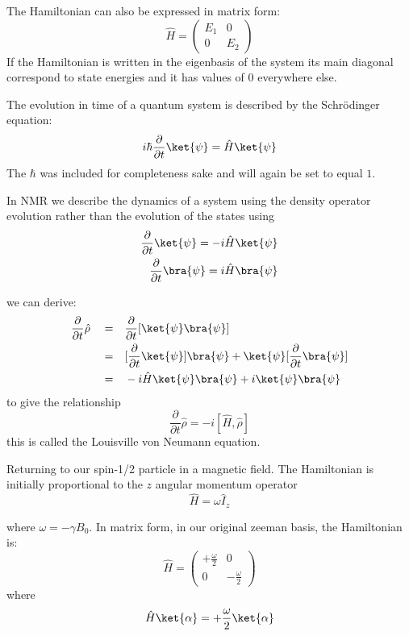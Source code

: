 The Hamiltonian can also be expressed in matrix form:
\begin{equation}
  \hat{H} = \begin{pmatrix}
    E_1 & 0\\
    0 & E_2
\end{pmatrix}
\end{equation}
If the Hamiltonian is written in the eigenbasis of the system its main diagonal correspond to state energies and it has values of $0$ everywhere else.

The evolution in time of a quantum system is described by the Schr\"odinger equation:
\begin{equation}
  i\hbar\frac{\partial}{\partial{t}}\ket{\psi} = \hat{H}\ket{\psi}
\end{equation}
The $\hbar$ was included for completeness sake and will again be set to equal $1$.

In NMR we describe the dynamics of a system using the density operator evolution rather than the evolution of the states using
\begin{align}
  \frac{\partial}{\partial{t}}\ket{\psi} = -i\hat{H}\ket{\psi}\\
  \frac{\partial}{\partial{t}}\bra{\psi} = i\hat{H}\bra{\psi}
\end{align}

we can derive\citep{Neumann2018}:
\begin{align}
  \frac{\partial}{\partial{t}}\hat\rho\quad=&\quad \frac{\partial}{\partial{t}}[\ket{\psi}\bra{\psi}]\\
  =&\quad[\frac{\partial}{\partial{t}}\ket{\psi}]\bra{\psi} + \ket{\psi}[\frac{\partial}{\partial{t}}\bra{\psi}]\\
  =&\quad-i\hat{H}\ket{\psi}\bra{\psi} + i\ket{\psi}\bra{\psi}
\end{align}
to give the relationship
\begin{equation}
  \frac{\partial}{\partial{t}}\hat\rho = -i[\hat{H},\hat\rho]
\end{equation}
this is called the Louisville von Neumann equation.

Returning to our spin-1/2 particle in a magnetic field. The Hamiltonian is initially
proportional to the $z$ angular momentum operator
\begin{equation}
  \hat{H} = \omega\hat{I}_z
\end{equation}

where $\omega = -\gamma B_0$. In matrix form, in our original zeeman basis, the Hamiltonian is:
\begin{equation}
  \hat{H} = \begin{pmatrix}
+\frac{\omega}{2} & 0\\
0 & -\frac{\omega}{2}
\end{pmatrix}
\end{equation}
where
\begin{equation}
  \hat{H}\ket{\alpha} = +\frac{\omega}{2}\ket{\alpha}
\end{equation}

